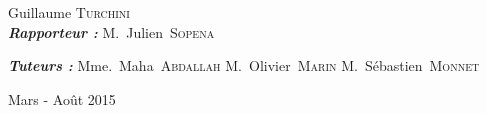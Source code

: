 \documentclass{article}
\begin{document}
\begin{titlepage}
\begin{sffamily}
\begin{center}
    \begin{minipage}{0.4\textwidth}
      \begin{flushleft} \large
        Guillaume \textsc{Turchini}\\[0.5cm]
				\textbf{\emph{Rapporteur :}} M.~Julien~\textsc{Sopena}
      \end{flushleft}
    \end{minipage}
    \begin{minipage}{0.4\textwidth}
      \begin{flushright} \large
				\textbf{\emph{Tuteurs :}} Mme.~Maha~\textsc{Abdallah} M.~Olivier~\textsc{Marin} M.~Sébastien~\textsc{Monnet}
      \end{flushright}
    \end{minipage}

    \vfill

    {\large Mars - Août 2015}

  \end{center}
  \end{sffamily}
\end{titlepage}


\tableofcontents















\end{document}
